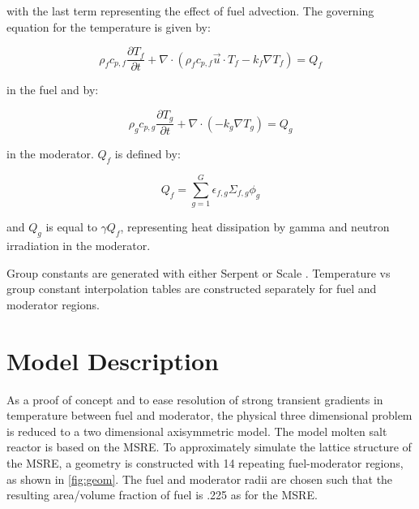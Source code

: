 \documentclass{article}
\let\Oldsection\section
\renewcommand{\section}{\FloatBarrier\Oldsection}
\begin{document}
with the last term representing the effect of fuel advection. The governing
equation for the temperature is given by:

\begin{equation}
  \rho_fc_{p,f}\frac{\partial T_f}{\partial t} + \nabla\cdot\left(\rho_f c_{p,f}
  \vec{u}\cdot T_f -k_f\nabla T_f\right) =  Q_f
  \label{eq:fuel_temp}
\end{equation}

in the fuel and by:

\begin{equation}
  \rho_gc_{p,g}\frac{\partial T_g}{\partial t} + \nabla\cdot\left(-k_g\nabla T_g\right) =  Q_g
  \label{eq:moderator_temp}
\end{equation}

in the moderator. $Q_f$ is defined by:

\begin{equation}
  Q_f = \sum_{g=1}^G \epsilon_{f,g}\Sigma_{f,g}\phi_g
  \label{eq:fuel_source}
\end{equation}

and $Q_g$ is equal to $\gamma Q_f$, representing heat dissipation by gamma and
neutron irradiation in the moderator.

Group constants
are generated with either Serpent \cite{leppanen_serpent_2015} or Scale
\cite{dehart_reactor_2011}. Temperature vs group constant interpolation tables
are constructed separately for fuel and moderator regions.

\section{Model Description}

As a proof of concept and to ease resolution of strong transient gradients in
temperature between fuel and moderator, the physical three dimensional problem
is reduced to a two dimensional axisymmetric model. The model molten salt
reactor is based on the \gls{MSRE}. To approximately simulate the lattice
structure of the \gls{MSRE}, a geometry is constructed with 14 repeating
fuel-moderator regions, as shown in \cref{fig:geom}. The fuel and moderator
radii are chosen such that the resulting area/volume fraction of fuel is .225 as
for the \gls{MSRE}.
\end{document}
